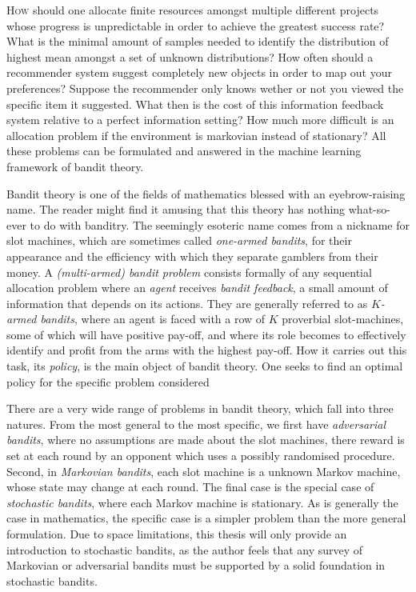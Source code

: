 \lettrine[lines=4]{\textcolor{dropcap}{H}}{ow} should one allocate finite resources amongst multiple different projects whose progress is unpredictable in order to achieve the greatest success rate? What is the minimal amount of samples needed to identify the distribution of highest mean amongst a set of unknown distributions? How often should a recommender system suggest completely new objects in order to map out your preferences? Suppose the recommender only knows wether or not you viewed the specific item it suggested. What then is the cost of this information feedback system relative to a perfect information setting? How much more difficult is an allocation problem if the environment is markovian instead of stationary? All these problems can be formulated and answered in the machine learning framework of bandit theory. 

\par Bandit theory is one of the fields of mathematics blessed with an eyebrow-raising name. The reader might find it amusing that this theory has nothing what-so-ever to do with banditry.  The seemingly esoteric name comes from a nickname for slot machines, which are sometimes called {\em one-armed bandits}, for their appearance and the efficiency with which they separate gamblers from their money. A {\em (multi-armed) bandit problem} consists formally of any sequential allocation problem where an {\em agent} receives {\em bandit feedback}, a small amount of information that depends on its actions. They are generally referred to as {\em $K$-armed bandits}, where an agent is faced with a row of $K$ proverbial slot-machines, some of which will have positive pay-off, and where its role becomes to effectively identify and profit from the arms with the highest pay-off. How it carries out this task, its {\em policy}, is the main object of bandit theory. One seeks to find an optimal policy for the specific problem considered

\par There are a very wide range of problems in bandit theory, which fall into three natures. From the most general to the most specific, we first have {\em adversarial bandits}, where no assumptions are made about the slot machines, there reward is set at each round by an opponent which uses a possibly randomised procedure. Second, in {\em Markovian bandits}, each slot machine is a unknown Markov machine, whose state may change at each round. The final case is the special case of {\em stochastic bandits}, where each Markov machine is stationary. As is generally the case in mathematics, the specific case is a simpler problem than the more general formulation. Due to space limitations, this thesis will only provide an introduction to stochastic bandits, as the author feels that any survey of Markovian or adversarial bandits must be supported by a solid foundation in stochastic bandits. 

